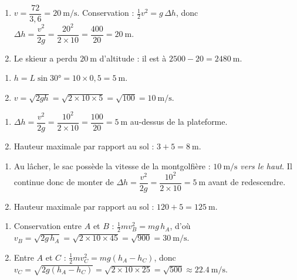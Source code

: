 \documentclass[11pt,a4paper]{article}
\begin{document}

\begin{corrige}
\begin{enumerate}[label=\alph*)]
  \item $v=\dfrac{72}{3,6}=\qty{20}{\metre\per\second}$. Conservation : $\tfrac12 v^2=g\,\Delta h$, donc
        $\Delta h=\dfrac{v^2}{2g}=\dfrac{20^2}{2\times10}=\dfrac{400}{20}=\qty{20}{\metre}$.
  \item Le skieur a perdu $\qty{20}{\metre}$ d'altitude : il est à
        $2500-20=\qty{2480}{\metre}$.
\end{enumerate}
\end{corrige}

\begin{corrige}
\begin{enumerate}[label=\alph*)]
  \item $h=L\sin\ang{30}=10\times0,5=\qty{5}{\metre}$.
  \item $v=\sqrt{2gh}=\sqrt{2\times10\times5}=\sqrt{100}=\qty{10}{\metre\per\second}$.
\end{enumerate}
\end{corrige}

\begin{corrige}
\begin{enumerate}[label=\alph*)]
  \item $\Delta h=\dfrac{v^2}{2g}=\dfrac{10^2}{2\times10}=\dfrac{100}{20}=\qty{5}{\metre}$ au-dessus de
        la plateforme.
  \item Hauteur maximale par rapport au sol : $3+5=\qty{8}{\metre}$.
\end{enumerate}
\end{corrige}

\begin{corrige}
\begin{enumerate}[label=\alph*)]
  \item Au lâcher, le sac possède la vitesse de la montgolfière : $\qty{10}{\metre\per\second}$
        \emph{vers le haut}. Il continue donc de monter de
        $\Delta h=\dfrac{v^2}{2g}=\dfrac{10^2}{2\times10}=\qty{5}{\metre}$ avant de redescendre.
  \item Hauteur maximale par rapport au sol : $120+5=\qty{125}{\metre}$.
\end{enumerate}
\end{corrige}

\begin{corrige}
\begin{enumerate}[label=\alph*)]
  \item Conservation entre $A$ et $B$ : $\tfrac12 m v_B^2=mg\,h_A$, d'où
        $v_B=\sqrt{2g\,h_A}=\sqrt{2\times10\times45}=\sqrt{900}=\qty{30}{\metre\per\second}$.
  \item Entre $A$ et $C$ : $\tfrac12 m v_C^2=mg(h_A-h_C)$, donc
        $v_C=\sqrt{2g(h_A-h_C)}=\sqrt{2\times10\times25}=\sqrt{500}\approx\qty{22,4}{\metre\per\second}$.
\end{enumerate}
\end{corrige}
\end{document}
